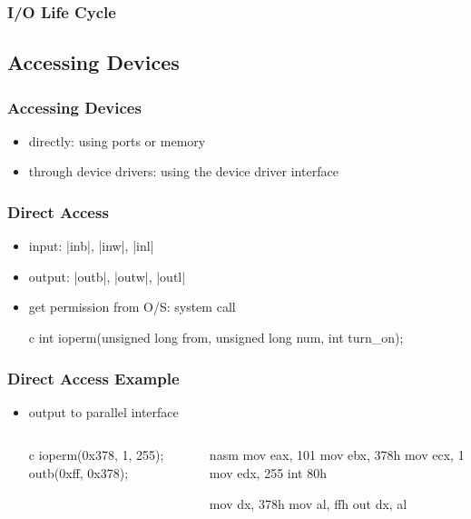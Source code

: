 \documentclass[dvipsnames]{beamer}
\begin{document}
\begin{frame}
  \frametitle{I/O Life Cycle}

  \begin{center}
  \end{center}
\end{frame}

\subsection{Accessing Devices}

\begin{frame}
  \frametitle{Accessing Devices}

  \begin{itemize}
    \item directly: using ports or memory

    \medskip
    \item through device drivers: using the device driver interface
  \end{itemize}
\end{frame}

\begin{frame}[fragile]
  \frametitle{Direct Access}

  \begin{itemize}
    \item input: |inb|, |inw|, |inl|
    \item output: |outb|, |outw|, |outl|

    \pause
    \medskip
    \item get permission from O/S:  system call
    \begin{pygments}{c}
int ioperm(unsigned long from,
           unsigned long num,
           int turn_on);
    \end{pygments}
  \end{itemize}
\end{frame}

\begin{frame}[fragile]
  \frametitle{Direct Access Example}

  \begin{itemize}
    \item output to parallel interface

    \begin{columns}[t]
      \begin{pygments}{c}
ioperm(0x378, 1, 255);
outb(0xff, 0x378);
      \end{pygments}

      \pause
    \begin{pygments}{nasm}
mov  eax, 101
mov  ebx, 378h
mov  ecx, 1
mov  edx, 255
int  80h

mov  dx, 378h
mov  al, ffh
out  dx, al
      \end{pygments}
    \end{columns}
  \end{itemize}
\end{frame}
\end{document}
